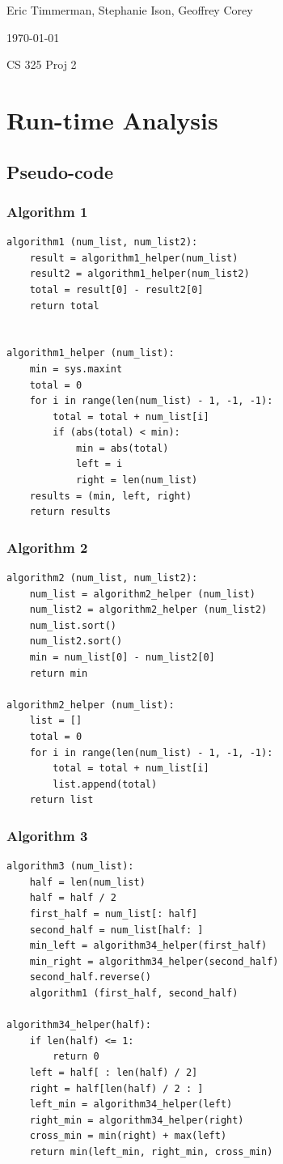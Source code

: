 \documentclass[letterpaper,10pt,titlepage]{article}
\def\name{Eric Timmerman, Stephanie Ison, Geoffrey Corey}
\begin{document}
\hfill \name

\hfill \today

\hfill CS 325 Proj 2

\section{Run-time Analysis}

\subsection{Pseudo-code}
\subsubsection{Algorithm 1}
\begin{verbatim}
algorithm1 (num_list, num_list2):
    result = algorithm1_helper(num_list)
    result2 = algorithm1_helper(num_list2)
    total = result[0] - result2[0]
    return total


algorithm1_helper (num_list):
    min = sys.maxint
    total = 0
    for i in range(len(num_list) - 1, -1, -1):
        total = total + num_list[i]
        if (abs(total) < min):
            min = abs(total)
            left = i
            right = len(num_list)
    results = (min, left, right)
    return results
\end{verbatim}
\subsubsection{Algorithm 2}
\begin{verbatim}
algorithm2 (num_list, num_list2):
    num_list = algorithm2_helper (num_list)
    num_list2 = algorithm2_helper (num_list2)
    num_list.sort()
    num_list2.sort()
    min = num_list[0] - num_list2[0]
    return min

algorithm2_helper (num_list):
    list = []
    total = 0
    for i in range(len(num_list) - 1, -1, -1):
        total = total + num_list[i]
        list.append(total)
    return list
\end{verbatim}
\subsubsection{Algorithm 3}
\begin{verbatim}
algorithm3 (num_list):
    half = len(num_list)
    half = half / 2
    first_half = num_list[: half]
    second_half = num_list[half: ]
    min_left = algorithm34_helper(first_half)
    min_right = algorithm34_helper(second_half)
    second_half.reverse()
    algorithm1 (first_half, second_half)

algorithm34_helper(half):
    if len(half) <= 1:
        return 0
    left = half[ : len(half) / 2]
    right = half[len(half) / 2 : ]
    left_min = algorithm34_helper(left)
    right_min = algorithm34_helper(right)
    cross_min = min(right) + max(left)
    return min(left_min, right_min, cross_min)
\end{verbatim}
\end{document}
